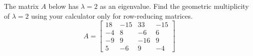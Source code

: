 The matrix $A$ below has $\lambda=2$ as an eigenvalue.  Find the geometric multiplicity of $\lambda=2$ using your calculator only for row-reducing matrices.
%
\begin{equation*}
A=
\begin{bmatrix}
18 & -15 & 33 & -15\\
-4 & 8 & -6 & 6\\
-9 & 9 & -16 & 9\\
5 & -6 & 9 & -4
\end{bmatrix}
\end{equation*}
